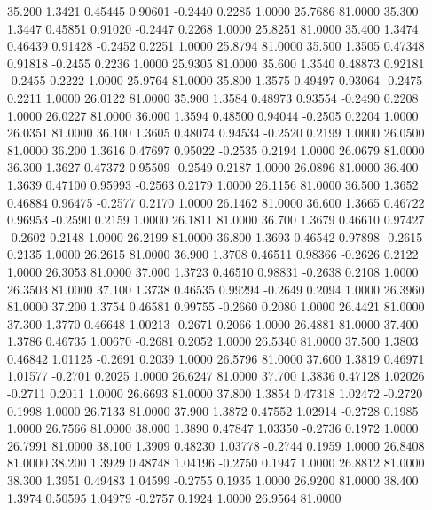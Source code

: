   35.200   1.3421   0.45445   0.90601  -0.2440   0.2285   1.0000  25.7686  81.0000
  35.300   1.3447   0.45851   0.91020  -0.2447   0.2268   1.0000  25.8251  81.0000
  35.400   1.3474   0.46439   0.91428  -0.2452   0.2251   1.0000  25.8794  81.0000
  35.500   1.3505   0.47348   0.91818  -0.2455   0.2236   1.0000  25.9305  81.0000
  35.600   1.3540   0.48873   0.92181  -0.2455   0.2222   1.0000  25.9764  81.0000
  35.800   1.3575   0.49497   0.93064  -0.2475   0.2211   1.0000  26.0122  81.0000
  35.900   1.3584   0.48973   0.93554  -0.2490   0.2208   1.0000  26.0227  81.0000
  36.000   1.3594   0.48500   0.94044  -0.2505   0.2204   1.0000  26.0351  81.0000
  36.100   1.3605   0.48074   0.94534  -0.2520   0.2199   1.0000  26.0500  81.0000
  36.200   1.3616   0.47697   0.95022  -0.2535   0.2194   1.0000  26.0679  81.0000
  36.300   1.3627   0.47372   0.95509  -0.2549   0.2187   1.0000  26.0896  81.0000
  36.400   1.3639   0.47100   0.95993  -0.2563   0.2179   1.0000  26.1156  81.0000
  36.500   1.3652   0.46884   0.96475  -0.2577   0.2170   1.0000  26.1462  81.0000
  36.600   1.3665   0.46722   0.96953  -0.2590   0.2159   1.0000  26.1811  81.0000
  36.700   1.3679   0.46610   0.97427  -0.2602   0.2148   1.0000  26.2199  81.0000
  36.800   1.3693   0.46542   0.97898  -0.2615   0.2135   1.0000  26.2615  81.0000
  36.900   1.3708   0.46511   0.98366  -0.2626   0.2122   1.0000  26.3053  81.0000
  37.000   1.3723   0.46510   0.98831  -0.2638   0.2108   1.0000  26.3503  81.0000
  37.100   1.3738   0.46535   0.99294  -0.2649   0.2094   1.0000  26.3960  81.0000
  37.200   1.3754   0.46581   0.99755  -0.2660   0.2080   1.0000  26.4421  81.0000
  37.300   1.3770   0.46648   1.00213  -0.2671   0.2066   1.0000  26.4881  81.0000
  37.400   1.3786   0.46735   1.00670  -0.2681   0.2052   1.0000  26.5340  81.0000
  37.500   1.3803   0.46842   1.01125  -0.2691   0.2039   1.0000  26.5796  81.0000
  37.600   1.3819   0.46971   1.01577  -0.2701   0.2025   1.0000  26.6247  81.0000
  37.700   1.3836   0.47128   1.02026  -0.2711   0.2011   1.0000  26.6693  81.0000
  37.800   1.3854   0.47318   1.02472  -0.2720   0.1998   1.0000  26.7133  81.0000
  37.900   1.3872   0.47552   1.02914  -0.2728   0.1985   1.0000  26.7566  81.0000
  38.000   1.3890   0.47847   1.03350  -0.2736   0.1972   1.0000  26.7991  81.0000
  38.100   1.3909   0.48230   1.03778  -0.2744   0.1959   1.0000  26.8408  81.0000
  38.200   1.3929   0.48748   1.04196  -0.2750   0.1947   1.0000  26.8812  81.0000
  38.300   1.3951   0.49483   1.04599  -0.2755   0.1935   1.0000  26.9200  81.0000
  38.400   1.3974   0.50595   1.04979  -0.2757   0.1924   1.0000  26.9564  81.0000
